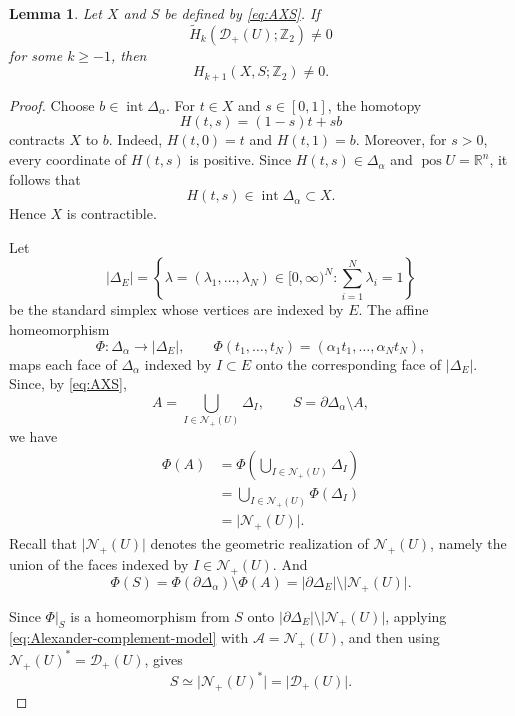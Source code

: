 \documentclass[12pt,reqno]{amsart}
\numberwithin{equation}{section}
\newtheorem{lemma}[theorem]{Lemma}
\theoremstyle{remark}
\DeclareMathOperator{\pos}{pos}
\newcommand{\R}{\mathbb R}
\newcommand{\Ncal}{\mathcal N}
\newcommand{\Dcal}{\mathcal D}
\begin{document}
\begin{lemma}\label{lem:relative-homology-general}
Let $X$ and $S$ be defined by \eqref{eq:AXS}. If
\begin{equation}\label{eq:deletion-homology-degree}
 \widetilde H_k(\Dcal_+(U);\mathbb Z_2)\neq0
\end{equation}
for some $k\geq-1$, then
\begin{equation}
 H_{k+1}(X,S;\mathbb Z_2)\neq0.
\end{equation}
\end{lemma}

\begin{proof}
	Choose \(b\in\operatorname{int}\Delta_\alpha\). For \(t\in X\) and \(s\in[0,1]\), the homotopy
	\begin{equation}\label{eq:X-contraction}
		H(t,s)=(1-s)t+sb
	\end{equation}
	contracts \(X\) to \(b\). Indeed, \(H(t,0)=t\) and \(H(t,1)=b\).
	Moreover, for \(s>0\), every coordinate of \(H(t,s)\) is positive.
	Since \(H(t,s)\in\Delta_\alpha\) and \(\pos U=\R^n\), it follows that
	\[
	H(t,s)\in\operatorname{int}\Delta_\alpha\subset X.
	\]
	Hence \(X\) is contractible.
	
		Let
	\[
	|\Delta_E|
	=
	\left\{
	\lambda=(\lambda_1,\ldots,\lambda_N)\in[0,\infty)^N:
	\sum_{i=1}^N\lambda_i=1
	\right\}
	\]
	be the standard simplex whose vertices are indexed by \(E\).
	The affine homeomorphism
	\[
	\Phi:\Delta_\alpha\longrightarrow\lvert\Delta_E\rvert,
	\qquad
	\Phi(t_1,\ldots,t_N)
	=
	(\alpha_1t_1,\ldots,\alpha_Nt_N),
	\]
		maps each face of \(\Delta_\alpha\) indexed by \(I\subset E\) onto
	the corresponding face of \(\lvert\Delta_E\rvert\). Since, by \eqref{eq:AXS},
	\[
	A=\bigcup_{I\in\Ncal_+(U)}\Delta_I,
	\qquad
	S=\partial\Delta_\alpha\setminus A,
	\]
 we have
	\[
	\begin{aligned}
		\Phi(A)
		&=
		\Phi\left(
		\bigcup_{I\in\Ncal_+(U)}\Delta_I
		\right)\\
		&=
		\bigcup_{I\in\Ncal_+(U)}\Phi(\Delta_I)\\
		&=
		\lvert\Ncal_+(U)\rvert.
	\end{aligned}
	\]
Recall that \(\lvert\Ncal_+(U)\rvert\) denotes the geometric
realization of \(\Ncal_+(U)\), namely the union of the faces indexed
by \(I\in\Ncal_+(U)\).	And
	\[
	\Phi(S)
	=
	\Phi(\partial\Delta_\alpha)\setminus\Phi(A)
	=
	\lvert\partial\Delta_E\rvert
	\setminus
	\lvert\Ncal_+(U)\rvert.
	\]
	

	
	
	 Since \(\Phi|_S\) is a homeomorphism from \(S\) onto
	\(\lvert\partial\Delta_E\rvert
	\setminus\lvert\Ncal_+(U)\rvert\), applying
	\eqref{eq:Alexander-complement-model} with
	\(\mathcal A=\Ncal_+(U)\), and then using
	\(\Ncal_+(U)^*=\Dcal_+(U)\), gives
	\[
	S
	\simeq
	\lvert\Ncal_+(U)^*\rvert
	=
	\lvert\Dcal_+(U)\rvert.
	\]
	

\end{proof}
\end{document}
